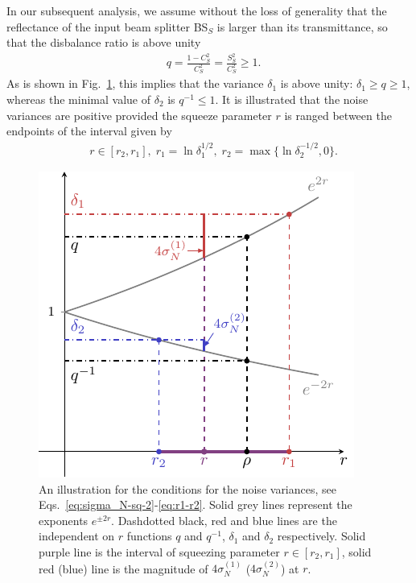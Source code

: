 \documentclass[%
reprint,
superscriptaddress,
 amsmath,amssymb,amsfonts,
 aps,
 pra,
 longbibliography
]{revtex4-2}
\begin{document}
In our subsequent analysis,
we assume without the loss of generality
that the reflectance of the input beam splitter BS$_S$ is
larger than its transmittance,
so that the disbalance ratio is above unity 
\begin{align}
  \label{eq:q-param}
  &
    q=\frac{1-C_S^2}{C_S^2}=\frac{S_S^2}{C_S^2}\ge 1.
\end{align}
As is shown in Fig.~\ref{fig:squeezing},
this implies that the variance $\delta_1$
is above unity: $\delta_1\ge q\ge 1$,
whereas the minimal value of $\delta_2$
is $q^{-1}\le 1$.
It is illustrated that
the noise variances are positive
provided the squeeze parameter $r$
is ranged between
the endpoints of the interval given by
\begin{align}
  \label{eq:r1-r2}
  &
    r\in[r_2,r_1],\;
    r_1=\ln\delta_1^{1/2},
    \;
    r_2=\max\{\ln\delta_2^{-1/2},0\}.
\end{align}

\begin{figure}
    \centering
    \includegraphics[width=0.9\linewidth, page={2}]{tikz_article.pdf}
    \caption{An illustration for the conditions for the noise variances, see Eqs.~\eqref{eq:sigma_N-sq-2}-\eqref{eq:r1-r2}.
    Solid grey lines represent the exponents $e^{\pm2r}$. Dashdotted black, red and blue lines are the independent on $r$ functions $q$ and $q^{-1}$, $\delta_1$ and $\delta_2$ respectively. Solid purple line is the interval of squeezing parameter $r\in[r_2,r_1]$, solid red (blue) line %
    is the magnitude of $4\sigma_N^{(1)}$ ($4\sigma_N^{(2)}$) at $r$.}
    \label{fig:squeezing}
\end{figure}
\end{document}
